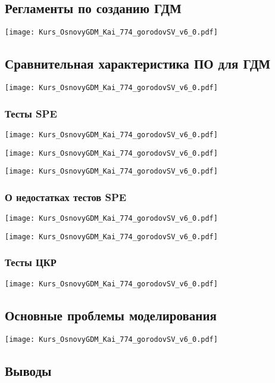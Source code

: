 \documentclass[main.tex]{subfiles}
\begin{document}
\subsection{Регламенты по созданию ГДМ}

\texttt{[image: Kurs\_OsnovyGDM\_Kai\_774\_gorodovSV\_v6\_0.pdf]}

\subsection{Сравнительная характеристика ПО для ГДМ}

\texttt{[image: Kurs\_OsnovyGDM\_Kai\_774\_gorodovSV\_v6\_0.pdf]}

\subsubsection{Тесты SPE}

\texttt{[image: Kurs\_OsnovyGDM\_Kai\_774\_gorodovSV\_v6\_0.pdf]}

\texttt{[image: Kurs\_OsnovyGDM\_Kai\_774\_gorodovSV\_v6\_0.pdf]}

\texttt{[image: Kurs\_OsnovyGDM\_Kai\_774\_gorodovSV\_v6\_0.pdf]}

\subsubsection{О недостатках тестов SPE}

\texttt{[image: Kurs\_OsnovyGDM\_Kai\_774\_gorodovSV\_v6\_0.pdf]}

\texttt{[image: Kurs\_OsnovyGDM\_Kai\_774\_gorodovSV\_v6\_0.pdf]}

\subsubsection{Тесты ЦКР}

\texttt{[image: Kurs\_OsnovyGDM\_Kai\_774\_gorodovSV\_v6\_0.pdf]}

\subsection{Основные проблемы моделирования}

\texttt{[image: Kurs\_OsnovyGDM\_Kai\_774\_gorodovSV\_v6\_0.pdf]}

\subsection{Выводы}
\end{document}
